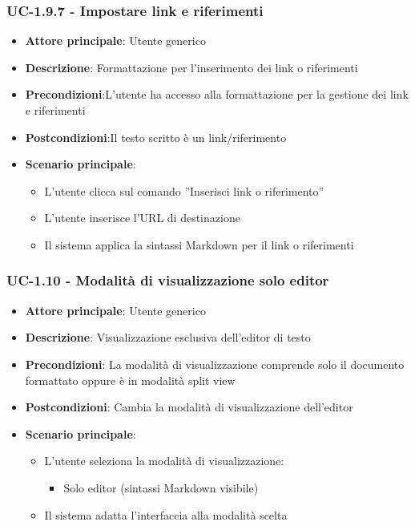 \documentclass[11pt,a4paper]{article}
\begin{document}
\subsubsection{UC-1.9.7 - Impostare link e riferimenti}
\begin{itemize}
    \item \textbf{Attore principale}: Utente generico
    \item \textbf{Descrizione}: Formattazione per l’inserimento dei link o riferimenti
    \item \textbf{Precondizioni}:L’utente ha accesso alla formattazione per la gestione dei link e riferimenti
    \item \textbf{Postcondizioni}:Il testo scritto è un link/riferimento
    \item \textbf{Scenario principale}:
        \begin{itemize}
            \item L’utente clicca sul comando ”Inserisci link o riferimento”
            \item L’utente inserisce l’URL di destinazione
            \item Il sistema applica la sintassi Markdown per il link o riferimenti
        \end{itemize}
\end{itemize}

\subsubsection{UC-1.10 - Modalità di visualizzazione solo editor}
\begin{itemize}
    \item \textbf{Attore principale}: Utente generico
    \item \textbf{Descrizione}: Visualizzazione esclusiva dell’editor di testo
    \item \textbf{Precondizioni}: La modalità di visualizzazione comprende solo il documento formattato oppure è in modalità split view
    \item \textbf{Postcondizioni}: Cambia la modalità di visualizzazione dell’editor
    \item \textbf{Scenario principale}:
        \begin{itemize}
            \item L'utente seleziona la modalità di visualizzazione:
                    \begin{itemize}
                    \item Solo editor (sintassi Markdown visibile)
                    \end{itemize}
            \item Il sistema adatta l'interfaccia alla modalità scelta
        \end{itemize}
\end{itemize}
\end{document}
